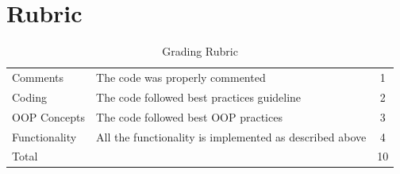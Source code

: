 \documentclass[a4paper,12pt]{article}
\begin{document}
\section{Rubric}
\begin{table}[!h]
	\centering
	\begin{tabular}{llc}
		\toprule
		Comments      & The code was properly commented                         & 1  \\
		Coding        & The code followed best practices guideline              & 2  \\
		OOP Concepts  & The code followed best OOP practices                    & 3  \\
		Functionality & All the functionality is implemented as described above & 4  \\
		\midrule
		Total         &                                                         & 10 \\
		\bottomrule
	\end{tabular}
	\caption{Grading Rubric}
	\label{Grading}
\end{table}


\newpage
\end{document}
